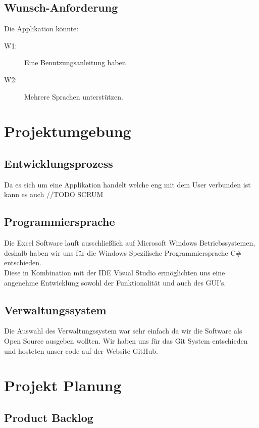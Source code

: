\documentclass{article}
\begin{document}
\subsection{Wunsch-Anforderung}
Die Applikation könnte:
\begin{description}
	\item[W1:] Eine Benutzungsanleitung haben.
	\item[W2:] Mehrere Sprachen unterstützen.
\end{description}

\newpage

\section{Projektumgebung}
\vspace{5mm}
\subsection{Entwicklungsprozess	}
Da es sich um eine Applikation handelt welche eng mit dem User verbunden ist kann es auch //TODO SCRUM

\subsection{Programmiersprache}
Die Excel Software lauft ausschließlich auf Microsoft Windows Betriebssystemen, deshalb haben wir uns für die Windows Spezifische Programmiersprache C\# entschieden. \\ Diese in Kombination mit der IDE Visual Studio ermöglichten uns eine angenehme Entwicklung sowohl der Funktionalität und auch des GUI's.
 

\subsection{Verwaltungssystem}
Die Auswahl des Verwaltungssystem war sehr einfach da wir die Software als Open Source ausgeben wollten. Wir haben uns für das Git System entschieden und hosteten unser code auf der Website GitHub.

\newpage

\section{Projekt Planung}
\subsection{Product Backlog}
\end{document}
